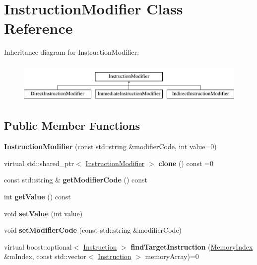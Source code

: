 \hypertarget{classInstructionModifier}{}\section{Instruction\+Modifier Class Reference}
\label{classInstructionModifier}
Inheritance diagram for Instruction\+Modifier\+:\begin{figure}[H]
\begin{center}
\leavevmode
\includegraphics[height=2.000000cm]{classInstructionModifier}
\end{center}
\end{figure}
\subsection*{Public Member Functions}
\begin{DoxyCompactItemize}
\item 
\mbox{\label{classInstructionModifier_a5df9e76d602aef4ddea650fbded1a87b}} 
{\bfseries Instruction\+Modifier} (const std\+::string \&modifier\+Code, int value=0)
\item 
\mbox{\label{classInstructionModifier_a9428b66e9cef33e36a23c29a560633b5}} 
virtual std\+::shared\+\_\+ptr$<$ \hyperlink{classInstructionModifier}{Instruction\+Modifier} $>$ {\bfseries clone} () const =0
\item 
\mbox{\label{classInstructionModifier_a895656f8ed78b2556191e619fb8df5f1}} 
const std\+::string \& {\bfseries get\+Modifier\+Code} () const
\item 
\mbox{\label{classInstructionModifier_a645afded73fb907e64720b1c9b53779e}} 
int {\bfseries get\+Value} () const
\item 
\mbox{\label{classInstructionModifier_ad5bc86617da41a50fc17fd2c9c306800}} 
void {\bfseries set\+Value} (int value)
\item 
\mbox{\label{classInstructionModifier_ae2e69b35ffdb18e71c9c9716c57a7e31}} 
void {\bfseries set\+Modifier\+Code} (const std\+::string \&modifier\+Code)
\item 
\mbox{\label{classInstructionModifier_a92b1272c5bce16b9d6a04841a6ee35e1}} 
virtual boost\+::optional$<$ \hyperlink{classInstruction}{Instruction} $>$ {\bfseries find\+Target\+Instruction} (\hyperlink{classMemoryIndex}{Memory\+Index} \&m\+Index, const std\+::vector$<$ \hyperlink{classInstruction}{Instruction} $>$ memory\+Array)=0
\end{DoxyCompactItemize}


